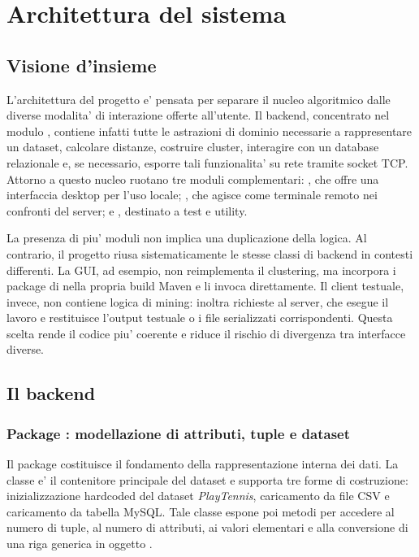 \chapter{Architettura del sistema}
\label{chap:architettura}

\section{Visione d'insieme}

L'architettura del progetto e' pensata per separare il nucleo algoritmico dalle diverse
modalita' di interazione offerte all'utente. Il backend, concentrato nel modulo
, contiene infatti tutte le astrazioni di dominio necessarie a
rappresentare un dataset, calcolare distanze, costruire cluster, interagire con un
database relazionale e, se necessario, esporre tali funzionalita' su rete tramite socket
TCP. Attorno a questo nucleo ruotano tre moduli complementari: , che offre
una interfaccia desktop per l'uso locale; , che agisce come terminale
remoto nei confronti del server; e , destinato a test e utility.

La presenza di piu' moduli non implica una duplicazione della logica. Al contrario, il
progetto riusa sistematicamente le stesse classi di backend in contesti differenti. La
GUI, ad esempio, non reimplementa il clustering, ma incorpora i package di
 nella propria build Maven e li invoca direttamente. Il client testuale,
invece, non contiene logica di mining: inoltra richieste al server, che esegue il lavoro
e restituisce l'output testuale o i file serializzati corrispondenti. Questa scelta rende
il codice piu' coerente e riduce il rischio di divergenza tra interfacce diverse.

\section{Il backend }

\subsection{Package : modellazione di attributi, tuple e dataset}

Il package  costituisce il fondamento della rappresentazione interna dei
dati. La classe  e' il contenitore principale del dataset e supporta tre
forme di costruzione: inizializzazione hardcoded del dataset \emph{PlayTennis},
caricamento da file CSV e caricamento da tabella MySQL. Tale classe espone poi metodi per
accedere al numero di tuple, al numero di attributi, ai valori elementari e alla
conversione di una riga generica in oggetto .

